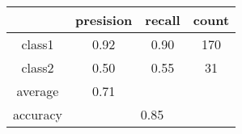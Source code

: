 
    \begin{tabular}{ | c | c | c | c | }
	\hline
	         &presision & recall & count \\ \hline
	class1   & 0.92    & 0.90  & 170 \\ \hline
	class2   & 0.50    & 0.55  & 31 \\ \hline
	average  & 0.71    &        &       \\
	\hline
	accuracy & \multicolumn{3}{c|}{0.85}\\
	\hline
    \end{tabular}